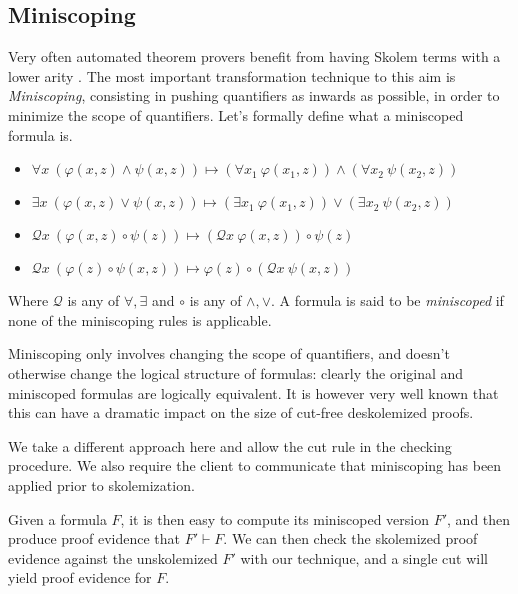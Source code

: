 \documentclass[a4paper,USenglish]{lipics-v2018}
\begin{document}
{\subsection{Miniscoping}

Very often automated theorem provers benefit from having Skolem terms
with a lower arity \cite{robinson01book}. The most important
transformation technique to this aim is \emph{Miniscoping}, consisting
in pushing quantifiers as inwards as possible, in order to minimize
the scope of quantifiers. Let's formally define what a miniscoped
formula is.

\begin{definition}
\mbox{}
  \begin{itemize}
  \item   $\forall x \ (\varphi(x,z) \land \psi(x,z)) \mapsto  (\forall x_1 \ \varphi(x_1,z)) \land (\forall x_2 \ \psi(x_2,z))$
  \item   $\exists x \ (\varphi(x,z) \lor \psi(x,z)) \mapsto  (\exists x_1 \ \varphi(x_1,z)) \lor (\exists x_2 \ \psi(x_2,z))$
  \item   $\mathcal{Q} x \ (\varphi(x,z) \circ \psi(z)) \mapsto  (\mathcal{Q} x \ \varphi(x,z)) \circ \psi(z)$
  \item   $\mathcal{Q} x \ (\varphi(z) \circ \psi(x,z)) \mapsto  \varphi (z)  \circ (\mathcal{Q} x \ \psi(x,z))$
  \end{itemize}
Where $\mathcal{Q}$ is any of $\forall, \exists$ and $\circ$ is any of
$\land, \lor$. A formula is said to be \emph{miniscoped} if none of
the miniscoping rules is applicable.
\end{definition}

Miniscoping only involves changing the scope of quantifiers, and
doesn't otherwise change the logical structure of formulas: clearly
the original and miniscoped formulas are logically equivalent. It is
however very well known \cite{baaz94fi} that this can have a dramatic
impact on the size of cut-free deskolemized proofs.

We take a different approach here and allow the cut rule in the
checking procedure. We also require the client to communicate that
miniscoping has been applied prior to skolemization.

Given a formula $F$, it is then easy to compute its miniscoped version
$F'$, and then produce proof evidence that $F' \vdash F$. We can then
check the skolemized proof evidence against the unskolemized $F'$ with
our technique, and a single cut will yield proof evidence for $F$.

}
\end{document}
